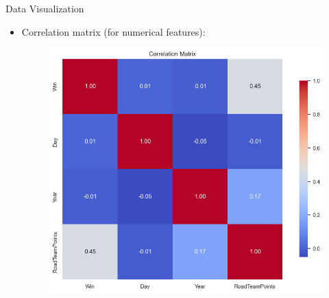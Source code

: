 \documentclass{beamer}
\begin{document}
\begin{frame}{Data Visualization}
    \begin{itemize}
        \item Correlation matrix (for numerical features):
            \begin{figure}
                \centering
                \includegraphics[width=0.75\linewidth]{images/correlation_matrix.png}
            \end{figure}
    \end{itemize}
\end{frame}
\end{document}
